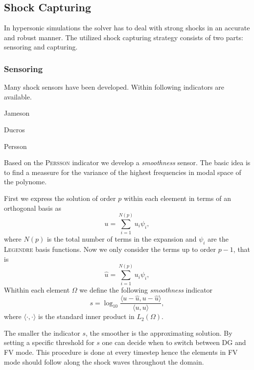 \subsection{Shock Capturing}

In hypersonic simulations the solver has to deal with strong shocks in an
accurate and robust manner. The utilized shock capturing strategy consists of
two parts: sensoring and capturing.

\subsubsection{Sensoring}

Many shock sensors have been developed. Within \FLEXI following indicators
are available.

\begin{description}
    \item[Jameson]\cite{jameson1981}
    \item[Ducros] \cite{ducros1999}
    \item[Persson] \cite{persson2006}
\end{description}

Based on the \textsc{Persson} indicator we develop a \emph{smoothness} sensor.
The basic idea is to find a meassure for the variance of the highest
frequencies in modal space of the polynome.

First we express the solution of order $p$ within each eleement in terms of
an orthogonal basis as
\begin{equation}
    u = \sum^{N(p)}_{i=1} u_i \psi_i,
\end{equation}
where $N(p)$ is the total number of terms in the expansion and $\psi_i$ are the
\textsc{Legendre} basis functions. Now we only consider the terms up to order $p-1$,
that is
\begin{equation}
    \hat{u} = \sum^{N(p)}_{i=1} u_i \psi_i,
\end{equation}
Whithin each element $\Omega$ we define the following \emph{smoothness} indicator
\begin{equation}
    s = \log_{10} \frac{\langle u - \hat{u}, u - \hat{u} \rangle}{\langle u, u \rangle},
\end{equation}
where $\langle \cdot,\cdot \rangle$ is the standard inner product in $L_2(\Omega)$.

The smaller the indicator $s$, the smoother is the approximating solution.  By
setting a specific threshold for $s$ one can decide when to switch between DG
and FV mode. This procedure is done at every timestep hence the elements in FV mode
should follow along the shock waves throughout the domain.

